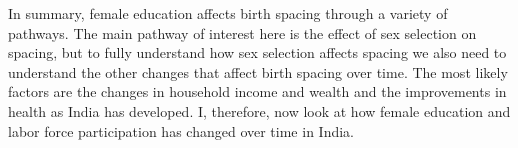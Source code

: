 In summary, female education affects birth spacing through a variety of pathways.
The main pathway of interest here is the effect of sex selection on spacing, but 
to fully understand how sex selection affects spacing we also need to understand 
the other changes that affect birth spacing over time.
The most likely factors are the changes in household income and wealth and the 
improvements in health as India has developed.
I, therefore, now look at how female education and labor force participation has changed
over time in India.


